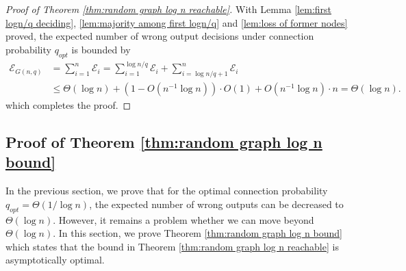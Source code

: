 \documentclass[a4paper,UKenglish]{lipics}
\newtheorem{thm}{Theorem}[section] %
\theoremstyle{definition}
\begin{document}
\begin{proof}[Proof of Theorem \ref{thm:random graph log n reachable}]
With Lemma \ref{lem:first logn/q deciding}, \ref{lem:majority among first logn/q} and \ref{lem:loss of former nodes} proved, the expected number of wrong output decisions under connection probability $q_{opt}$ is bounded by
\begin{equation}
\begin{aligned}
\label{equ:bound2}
	\mathcal{E}_{G(n,q)}
& =
	\sum_{i=1}^{n}	\mathcal{E}_i
	=
	\sum_{i=1}^{\log n/q}	\mathcal{E}_i + \sum_{i=\log n/q + 1}^{n}	\mathcal{E}_i
\\
& \le
	\Theta(\log n) + (1 - O(n^{-1}\log n))\cdot O(1) + O(n^{-1}\log n)\cdot n
	=
	\Theta(\log n).
\end{aligned}
\end{equation}
which completes the proof.
\end{proof}


\subsection {Proof of Theorem \ref{thm:random graph log n bound}}
In the previous section, we prove that for the optimal connection probability $q_{opt} = \Theta(1 / \log n)$, the expected number of wrong outputs can be decreased to $\Theta(\log n)$. 
However, it remains a problem whether we can move beyond $\Theta(\log n)$. In this section, we prove Theorem \ref{thm:random graph log n bound} which states that the bound in Theorem \ref{thm:random graph log n reachable} is asymptotically optimal.
\end{document}
